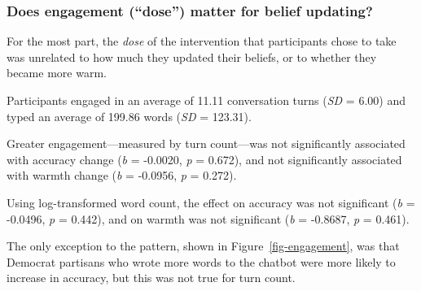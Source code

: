 \documentclass[
  11pt,
  oneside]{article}
\begin{document}
\subsubsection{Does engagement (``dose'') matter for belief
updating?}\label{does-engagement-dose-matter-for-belief-updating}

For the most part, the \emph{dose} of the intervention that participants
chose to take was unrelated to how much they updated their beliefs, or
to whether they became more warm.

Participants engaged in an average of 11.11 conversation turns
(\emph{SD} = 6.00) and typed an average of 199.86 words (\emph{SD} =
123.31).

Greater engagement---measured by turn count---was not significantly
associated with accuracy change (\emph{b} = -0.0020, \emph{p} = 0.672),
and not significantly associated with warmth change (\emph{b} = -0.0956,
\emph{p} = 0.272).

Using log-transformed word count, the effect on accuracy was not
significant (\emph{b} = -0.0496, \emph{p} = 0.442), and on warmth was
not significant (\emph{b} = -0.8687, \emph{p} = 0.461).

The only exception to the pattern, shown in Figure~\ref{fig-engagement},
was that Democrat partisans who wrote more words to the chatbot were
more likely to increase in accuracy, but this was not true for turn
count.
\end{document}
